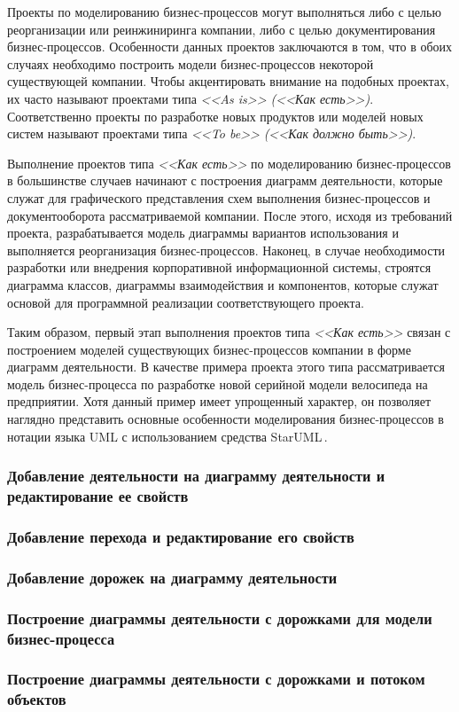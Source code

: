 \documentclass[a4paper,12pt]{report}
\newcommand{\staruml}{StarUML\,\tm}
\begin{document}
Проекты по моделированию бизнес-процессов могут выполняться либо с целью реорганизации или реинжиниринга компании, либо с целью документирования бизнес-процессов. Особенности данных проектов заключаются в том, что в обоих случаях необходимо построить модели бизнес-процессов некоторой существующей компании. Чтобы акцентировать внимание на подобных проектах, их часто называют проектами типа \textit{<<As is>> (<<Как есть>>)}. Соответственно проекты по разработке новых продуктов или моделей новых систем называют проектами типа \textit{<<To be>>} \textit{(<<Как должно быть>>)}.

Выполнение проектов типа\textit{ <<Как есть>>} по моделированию бизнес-процессов в большинстве случаев начинают с построения диаграмм деятельности, которые служат для графического представления схем выполнения бизнес-процессов и документооборота рассматриваемой компании. После этого, исходя из требований проекта, разрабатывается модель диаграммы вариантов использования и выполняется реорганизация бизнес-процессов. Наконец, в случае необходимости разработки или внедрения корпоративной информационной системы, строятся диаграмма классов, диаграммы взаимодействия и компонентов, которые служат основой для программной реализации соответствующего проекта.

Таким образом, первый этап выполнения проектов типа \textit{<<Как есть>>} связан с построением моделей существующих бизнес-процессов компании в форме диаграмм деятельности. В качестве примера проекта этого типа рассматривается модель бизнес-процесса по разработке новой серийной модели велосипеда на предприятии. Хотя данный пример имеет упрощенный характер, он позволяет наглядно представить основные особенности моделирования бизнес-процессов в нотации языка UML с использованием средства \staruml.

\subsubsection*{Добавление деятельности на диаграмму деятельности и редактирование ее свойств}
\subsubsection*{Добавление перехода и редактирование его свойств}
\subsubsection*{Добавление дорожек на диаграмму деятельности}
\subsubsection*{Построение диаграммы деятельности с дорожками для модели бизнес-процесса}
\subsubsection*{Построение диаграммы деятельности с дорожками и потоком объектов}

\newpage
{}
\listoffigures
\newpage
{}
\listoftables
\end{document}
